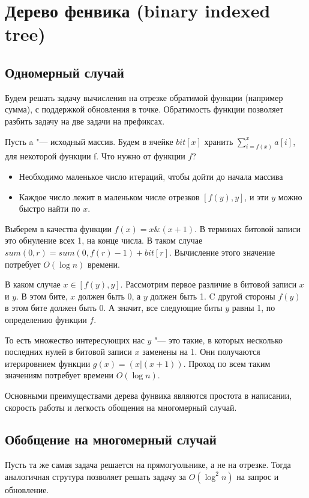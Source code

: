 \documentclass[12pt,a4paper]{article}
\theoremstyle{plain}
\begin{document}
\section{Дерево фенвика (binary indexed tree)}

\subsection{Одномерный случай}

Будем решать задачу вычисления на отрезке обратимой функции (например сумма), с поддержкой обновления в точке.
Обратимость функции позволяет разбить задачу на две задачи на префиксах. 

Пусть a "--- исходный массив.
Будем в ячейке $bit[x]$ хранить $\sum\limits_{i = f(x)}^{x}{a[i]}$, для некоторой функции f. Что нужно от функции $f$?

\begin{itemize}
\item Необходимо маленькое число итераций, чтобы дойти до начала массива
\item Каждое число лежит в маленьком числе отрезков $[f(y), y]$, и эти $y$ можно быстро найти по $x$.
\end{itemize}

Выберем в качества функции $f(x) = x \& (x + 1)$. В терминах битовой записи это обнуление всех 1, на конце числа.
В таком случае $sum(0, r) = sum(0, f(r)-1) + bit[r]$. Вычисление этого значение потребует $O(\log{n})$ времени.

В каком случае $x \in [f(y), y]$. Рассмотрим первое различие в битовой записи $x$ и $y$.
В этом бите, $x$ должен быть 0, а $y$ должен быть 1. C другой стороны $f(y)$ в этом бите должен быть 0.
А значит, все следующие биты $y$ равны 1, по определению функции $f$.

То есть множество интересующих нас $y$ "--- это такие, в которых несколько последних нулей в битовой записи $x$ заменены на 1.
Они получаются итерировнием функции $g(x) = (x | (x + 1))$. Проход по всем таким значениям потребует времени $O(\log{n})$.

Основными преимуществами дерева фунвика являются простота в написании, скорость работы и легкость обощения на многомерный случай.

\subsection{Обобщение на многомерный случай}

Пусть та же самая задача решается на прямогуольнике, а не на отрезке.
Тогда аналогичная струтура позволяет решать задачу за $O(\log^2{n})$ на запрос и обновление.
\end{document}
